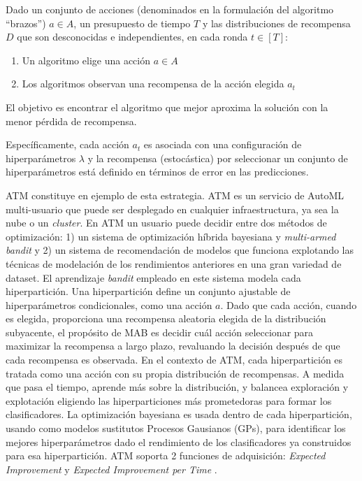 \begin{definition}

Dado un conjunto de acciones (denominados en la formulación del algoritmo ``brazos'') $a \in A$, un presupuesto de tiempo $T$ y las distribuciones de recompensa $D$ que son desconocidas e independientes, en cada ronda $t \in [T]$:

\begin{enumerate}
	\item Un algoritmo elige una acción $a \in A$
	\item Los algoritmos observan una recompensa de la acción elegida $a_t$
\end{enumerate}

El objetivo es encontrar el algoritmo que mejor aproxima la solución con la menor pérdida de recompensa.

\end{definition}

Específicamente, cada acción $a_t$ es asociada con una configuración de hiperparámetros $\lambda$ y la recompensa (estocástica) por seleccionar un conjunto de hiperparámetros está definido en términos de error en las predicciones.

ATM \cite{swearingen2017atm} constituye en ejemplo de esta estrategia. ATM es un servicio de AutoML multi-usuario que puede ser desplegado en cualquier infraestructura, ya sea la nube o un \textit{cluster}. En ATM un usuario puede decidir entre dos métodos de optimización: 1) un sistema de optimización híbrida bayesiana y \textit{multi-armed bandit} y 2) un sistema de recomendación de modelos que funciona explotando las técnicas de modelación de los rendimientos anteriores en una gran variedad de dataset. El aprendizaje \textit{bandit} empleado en este sistema modela cada hiperpartición. Una hiperpartición define un conjunto ajustable de hiperparámetros condicionales, como una acción $a$. Dado que cada acción, cuando es elegida, proporciona una recompensa aleatoria elegida de la distribución subyacente, el propósito de MAB es decidir cuál acción seleccionar para maximizar la recompensa a largo plazo, revaluando la decisión después de que cada recompensa es observada. En el contexto de ATM, cada hiperpartición es tratada como una acción con su propia distribución de recompensas. A medida que pasa el tiempo, aprende más sobre la distribución, y balancea exploración y explotación eligiendo las hiperparticiones más prometedoras para formar los clasificadores. La optimización bayesiana es usada dentro de cada hiperpartición, usando como modelos sustitutos Procesos Gausianos (GPs), para identificar los mejores hiperparámetros dado el rendimiento de los clasificadores ya construidos para esa hiperpartición. ATM soporta 2 funciones de adquisición: \textit{Expected Improvement} y \textit{Expected Improvement per Time} \cite{snoek2012practical}.

